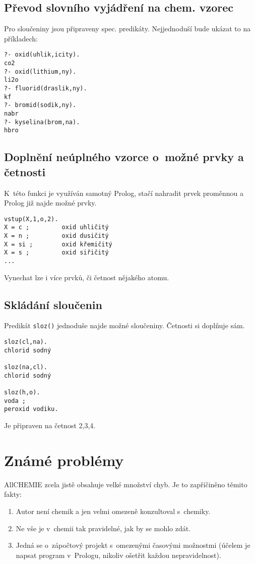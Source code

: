 \documentclass[a4paper]{article}
\begin{document}
\subsection{Převod slovního vyjádření na chem. vzorec}
Pro sloučeniny jsou připraveny spec. predikáty. Nejjednoduší bude ukázat to na příkladech:
\begin{verbatim}
?- oxid(uhlik,icity).
co2
?- oxid(lithium,ny).
li2o
?- fluorid(draslik,ny).
kf
?- bromid(sodik,ny).
nabr
?- kyselina(brom,na).
hbro
\end{verbatim}


\subsection{Doplnění neúplného vzorce o~možné prvky a četnosti}
K~této funkci je využíván samotný Prolog, stačí nahradit prvek proměnnou a Prolog již najde možné prvky.
\begin{verbatim}
vstup(X,1,o,2).
X = c ;         oxid uhličitý
X = n ;         oxid dusičitý
X = si ;        oxid křemičitý
X = s ;         oxid siřičitý
...
\end{verbatim}
Vynechat lze i více prvků, či četnost nějakého atomu.
\subsection{Skládání sloučenin}
Predikát \texttt{sloz()} jednoduše najde možné sloučeniny. Četnosti si doplňuje sám. 
\begin{verbatim}
sloz(cl,na).
chlorid sodný

sloz(na,cl).
chlorid sodný

sloz(h,o).
voda ;
peroxid vodiku.
\end{verbatim}
Je připraven na četnost 2,3,4.
\section{Známé problémy}
AllCHEMIE zcela jistě obsahuje velké množství chyb. Je to zapříčiněno těmito fakty:
\begin{enumerate}
\item Autor není chemik a jen velmi omezeně konzultoval s~chemiky.
\item Ne vše je v~chemii tak pravidelné, jak by se mohlo zdát.
\item Jedná se o~zápočtový projekt s~omezenými časovými možnostmi (účelem je napsat program v~Prologu, nikoliv ošetřit každou nepravidelnost).
\end{enumerate}
\end{document}
